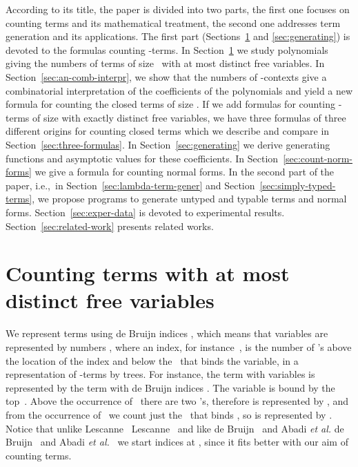 \documentclass{jfp1}
\newcommand{\ie}{i.e.,~}
\begin{document}
According to its title, the paper is divided into two parts, the first one focuses on counting terms
and its mathematical treatment, the second one addresses term generation and its applications. The
first part (Sections~\ref{sec:polyn-count-lambd} and \ref{sec:generating}) is devoted to
the formulas counting -terms.  In Section~\ref{sec:polyn-count-lambd} we study
polynomials giving the numbers of terms of size~ with at most  distinct free
variables.  In
Section~\ref{sec:an-comb-interpr}, we show that the numbers of -contexts give a
combinatorial interpretation of the coefficients of the polynomials and yield a new formula
for counting the closed terms of size . If we add formulas for counting -terms of
size  with exactly  distinct free variables, we have three formulas of three different origins for
counting closed terms which we describe and compare in Section~\ref{sec:three-formulas}.
In Section~\ref{sec:generating} we derive generating functions and asymptotic values for
these coefficients.  In Section~\ref{sec:count-norm-forms} we give a formula for counting
normal forms.  In the second part of the paper, \ie in Section~\ref{sec:lambda-term-gener} and
Section~\ref{sec:simply-typed-terms}, we propose programs to generate untyped and typable
terms and normal forms.  Section~\ref{sec:exper-data} is devoted to experimental
results.  Section~\ref{sec:related-work} presents related works.









\section{Counting terms with at most  distinct free variables}
\label{sec:polyn-count-lambd}


We represent terms using de Bruijn indices \cite{deBruijn72}, which means that
variables are represented by numbers ,
where an index, for instance~, is the number of 's above the location of
the index and below the~ that binds the variable, in a representation of
-terms by trees.  For instance, the term with variables  is
represented by the term with de Bruijn indices . The variable
 is bound by the top~.  Above the occurrence of~ there are two 's,
therefore  is represented by , and from the occurrence of~ we count
just the~ that binds , so  is represented by .  Notice that unlike
\ifJFP Lescanne~ \else Lescanne~\cite{LescannePOPL94} \fi and like
\ifJFP de Bruijn~ and Abadi \emph{et al.}
 \else de Bruijn~\cite{deBruijn72}  and Abadi \emph{et
  al.}~\cite{AbadiCCL91JFP} \fi we start
indices at , since it fits better with our aim of counting terms.
\end{document}
